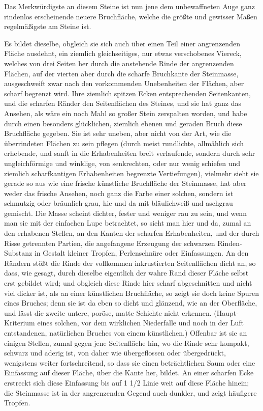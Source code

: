 \documentclass[a4paper, 11pt, oneside, german]{article}
\begin{document}
Das Merkwürdigste an diesem Steine ist nun jene dem unbewaffneten Auge ganz rindenlos erscheinende neuere Bruchfläche, welche die größte und gewisser Maßen regelmäßigste am Steine ist.

Es bildet dieselbe, obgleich sie sich auch über einen Teil einer angrenzenden Fläche ausdehnt, ein ziemlich gleichseitiges, nur etwas verschobenes Viereck, welches von drei Seiten her durch die anstehende Rinde der angrenzenden Flächen, auf der vierten aber durch die scharfe Bruchkante der Steinmasse, ausgeschweift zwar nach den vorkommenden Unebenheiten der Flächen, aber scharf begrenzt wird. Ihre ziemlich spitzen Ecken entsprechenden Seitenkanten, und die scharfen Ränder den Seitenflächen des Steines, und sie hat ganz das Ansehen, als wäre ein noch Mahl so großer Stein zerspalten worden, und habe durch einen besonders glücklichen, ziemlich ebenen und geraden Bruch diese Bruchfläche gegeben. Sie ist sehr uneben, aber nicht von der Art, wie die überrindeten Flächen zu sein pflegen (durch meist rundlichte, allmählich sich erhebende, und sanft in die Erhabenheiten breit verlaufende, sondern durch sehr ungleichförmige und winklige, von senkrechten, oder nur wenig schiefen und ziemlich scharfkantigen Erhabenheiten begrenzte Vertiefungen), vielmehr sieht sie gerade so aus wie eine frische künstliche Bruchfläche der Steinmasse, hat aber weder das frische Ansehen, noch ganz die Farbe einer solchen, sondern ist schmutzig oder bräunlich-grau, hie und da mit bläulichweiß und aschgrau gemischt. Die Masse scheint dichter, fester und weniger rau zu sein, und wenn man sie mit der einfachen Lupe betrachtet, so sieht man hier und da, zumal an den erhabenen Stellen, an den Kanten der scharfen Erhabenheiten, und der durch Risse getrennten Partien, die angefangene Erzeugung der schwarzen Rinden-Substanz in Gestalt kleiner Tropfen, Perlenschnüre oder Einfassungen. An den Rändern stößt die Rinde der vollkommen inkrustierten Seitenflächen dicht an, so dass, wie gesagt, durch dieselbe eigentlich der wahre Rand dieser Fläche selbst erst gebildet wird; und obgleich diese Rinde hier scharf abgeschnitten und nicht viel dicker ist, als an einer künstlichen Bruchfläche, so zeigt sie doch keine Spuren eines Bruches; denn sie ist da eben so dicht und glänzend, wie an der Oberfläche, und lässt die zweite untere, poröse, matte Schichte nicht erkennen. (Haupt-Kriterium eines solchen, vor dem wirklichen Niederfalle und noch in der Luft entstandenen, natürlichen Bruches von einem künstlichen.) Offenbar ist sie an einigen Stellen, zumal gegen jene Seitenfläche hin, wo die Rinde sehr kompakt, schwarz und aderig ist, von daher wie übergeflossen oder übergedrückt, wenigstens weiter fortschreitend, so dass sie einen beträchtlichen Saum oder eine Einfassung auf dieser Fläche, über die Kante her, bildet. An einer scharfen Ecke erstreckt sich diese Einfassung bis auf 1 1/2 Linie weit auf diese Fläche hinein; die Steinmasse ist in der angrenzenden Gegend auch dunkler, und zeigt häufigere Tropfen.
\end{document}
